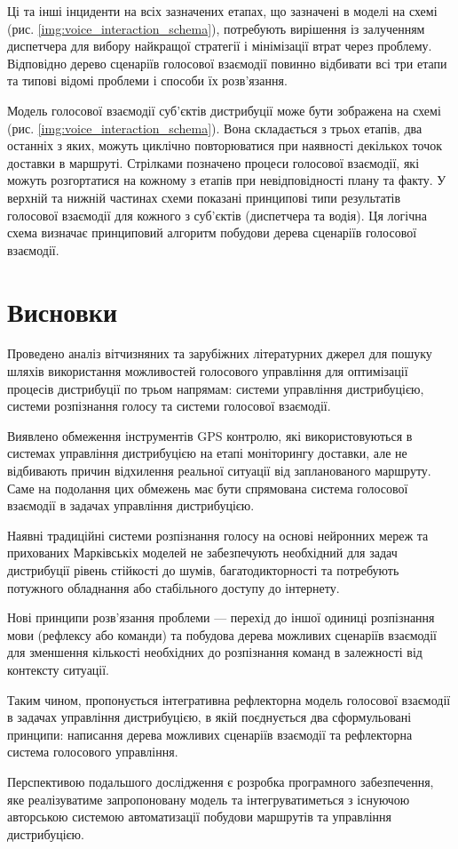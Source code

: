 Ці та інші інциденти на всіх зазначених етапах, що зазначені в моделі на схемі (рис. \ref{img:voice_interaction_schema}), потребують вирішення із залученням диспетчера для вибору найкращої стратегії і мінімізації втрат через проблему. Відповідно дерево сценаріїв голосової взаємодії повинно відбивати всі три етапи та типові відомі проблеми і способи їх розв’язання.

Модель голосової взаємодії суб’єктів дистрибуції може бути зображена на схемі (рис. \ref{img:voice_interaction_schema}). Вона складається з трьох етапів, два останніх з яких, можуть циклічно повторюватися при наявності декількох точок доставки в маршруті. Стрілками позначено процеси голосової взаємодії, які можуть розгортатися на кожному з етапів при невідповідності плану та факту. У верхній та нижній частинах схеми показані принципові типи результатів голосової взаємодії для кожного з суб’єктів (диспетчера та водія). Ця логічна схема визначає принциповий алгоритм побудови дерева сценаріїв голосової взаємодії.

\section{Висновки}
Проведено аналіз вітчизняних та зарубіжних літературних джерел для пошуку шляхів використання можливостей голосового управління для оптимізації процесів дистрибуції по трьом напрямам: системи управління дистрибуцією, системи розпізнання голосу та системи голосової взаємодії.

Виявлено обмеження інструментів GPS контролю, які використовуються в системах управління дистрибуцією на етапі моніторингу доставки, але не відбивають причин відхилення реальної ситуації від запланованого маршруту. Саме на подолання цих обмежень має бути спрямована система голосової взаємодії в задачах управління дистрибуцією.

Наявні традиційні системи розпізнання голосу на основі нейронних мереж та прихованих Марківськіх моделей не забезпечують необхідний для задач дистрибуції рівень стійкості до шумів, багатодикторності та потребують потужного обладнання або стабільного доступу до інтернету.

Нові принципи розв’язання проблеми — перехід до іншої одиниці розпізнання мови (рефлексу або команди) та побудова дерева можливих сценаріїв взаємодії для зменшення кількості необхідних до розпізнання команд в залежності від контексту ситуації.

Таким чином, пропонується інтегративна рефлекторна модель голосової взаємодії в задачах управління дистрибуцією, в якій поєднується два сформульовані принципи: написання дерева можливих сценаріїв взаємодії та рефлекторна система голосового управління.

Перспективою подальшого дослідження є розробка програмного забезпечення, яке реалізуватиме запропоновану модель та інтегруватиметься з існуючою авторською системою автоматизації побудови маршрутів та управління дистрибуцією.
